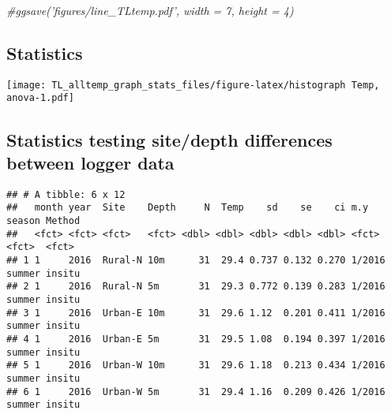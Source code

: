 \documentclass[
]{article}
\newenvironment{Shaded}{\begin{snugshade}}{\end{snugshade}}
\newcommand{\CommentTok}[1]{\textcolor[rgb]{0.56,0.35,0.01}{\textit{#1}}}
\newcommand{\KeywordTok}[1]{\textcolor[rgb]{0.13,0.29,0.53}{\textbf{#1}}}
\newcommand{\NormalTok}[1]{#1}
\newcommand{\OperatorTok}[1]{\textcolor[rgb]{0.81,0.36,0.00}{\textbf{#1}}}
\newcommand{\StringTok}[1]{\textcolor[rgb]{0.31,0.60,0.02}{#1}}
\begin{document}
\begin{Shaded}
\begin{Highlighting}[]
\CommentTok{#ggsave('figures/line_TLtemp.pdf', width = 7, height = 4)}
\end{Highlighting}
\end{Shaded}

\hypertarget{statistics}{%
\subsection{Statistics}\label{statistics}}

\begin{Shaded}
\end{Shaded}

\texttt{[image: TL\_alltemp\_graph\_stats\_files/figure-latex/histograph Temp, anova-1.pdf]}

\hypertarget{statistics-testing-sitedepth-differences-between-logger-data}{%
\subsection{Statistics testing site/depth differences between logger
data}\label{statistics-testing-sitedepth-differences-between-logger-data}}

\begin{Shaded}
\end{Shaded}

\begin{verbatim}
## # A tibble: 6 x 12
##   month year  Site    Depth     N  Temp    sd    se    ci m.y    season Method
##   <fct> <fct> <fct>   <fct> <dbl> <dbl> <dbl> <dbl> <dbl> <fct>  <fct>  <fct> 
## 1 1     2016  Rural-N 10m      31  29.4 0.737 0.132 0.270 1/2016 summer insitu
## 2 1     2016  Rural-N 5m       31  29.3 0.772 0.139 0.283 1/2016 summer insitu
## 3 1     2016  Urban-E 10m      31  29.6 1.12  0.201 0.411 1/2016 summer insitu
## 4 1     2016  Urban-E 5m       31  29.5 1.08  0.194 0.397 1/2016 summer insitu
## 5 1     2016  Urban-W 10m      31  29.6 1.18  0.213 0.434 1/2016 summer insitu
## 6 1     2016  Urban-W 5m       31  29.4 1.16  0.209 0.426 1/2016 summer insitu
\end{verbatim}
\end{document}
